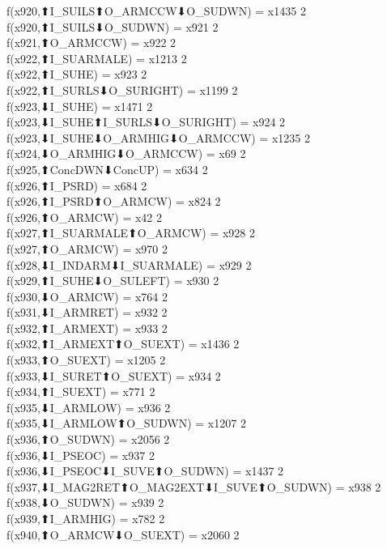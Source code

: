 f(x920,⬆I_SUILS⬆O_ARMCCW⬇O_SUDWN) = x1435 {2} \\
f(x920,⬆I_SUILS⬇O_SUDWN) = x921 {2} \\
f(x921,⬆O_ARMCCW) = x922 {2} \\
f(x922,⬆I_SUARMALE) = x1213 {2} \\
f(x922,⬆I_SUHE) = x923 {2} \\
f(x922,⬆I_SURLS⬇O_SURIGHT) = x1199 {2} \\
f(x923,⬇I_SUHE) = x1471 {2} \\
f(x923,⬇I_SUHE⬆I_SURLS⬇O_SURIGHT) = x924 {2} \\
f(x923,⬇I_SUHE⬇O_ARMHIG⬇O_ARMCCW) = x1235 {2} \\
f(x924,⬇O_ARMHIG⬇O_ARMCCW) = x69 {2} \\
f(x925,⬆ConcDWN⬇ConcUP) = x634 {2} \\
f(x926,⬆I_PSRD) = x684 {2} \\
f(x926,⬆I_PSRD⬆O_ARMCW) = x824 {2} \\
f(x926,⬆O_ARMCW) = x42 {2} \\
f(x927,⬆I_SUARMALE⬆O_ARMCW) = x928 {2} \\
f(x927,⬆O_ARMCW) = x970 {2} \\
f(x928,⬇I_INDARM⬇I_SUARMALE) = x929 {2} \\
f(x929,⬆I_SUHE⬇O_SULEFT) = x930 {2} \\
f(x930,⬇O_ARMCW) = x764 {2} \\
f(x931,⬇I_ARMRET) = x932 {2} \\
f(x932,⬆I_ARMEXT) = x933 {2} \\
f(x932,⬆I_ARMEXT⬆O_SUEXT) = x1436 {2} \\
f(x933,⬆O_SUEXT) = x1205 {2} \\
f(x933,⬇I_SURET⬆O_SUEXT) = x934 {2} \\
f(x934,⬆I_SUEXT) = x771 {2} \\
f(x935,⬇I_ARMLOW) = x936 {2} \\
f(x935,⬇I_ARMLOW⬆O_SUDWN) = x1207 {2} \\
f(x936,⬆O_SUDWN) = x2056 {2} \\
f(x936,⬇I_PSEOC) = x937 {2} \\
f(x936,⬇I_PSEOC⬇I_SUVE⬆O_SUDWN) = x1437 {2} \\
f(x937,⬇I_MAG2RET⬆O_MAG2EXT⬇I_SUVE⬆O_SUDWN) = x938 {2} \\
f(x938,⬇O_SUDWN) = x939 {2} \\
f(x939,⬆I_ARMHIG) = x782 {2} \\
f(x940,⬆O_ARMCW⬇O_SUEXT) = x2060 {2} \\
